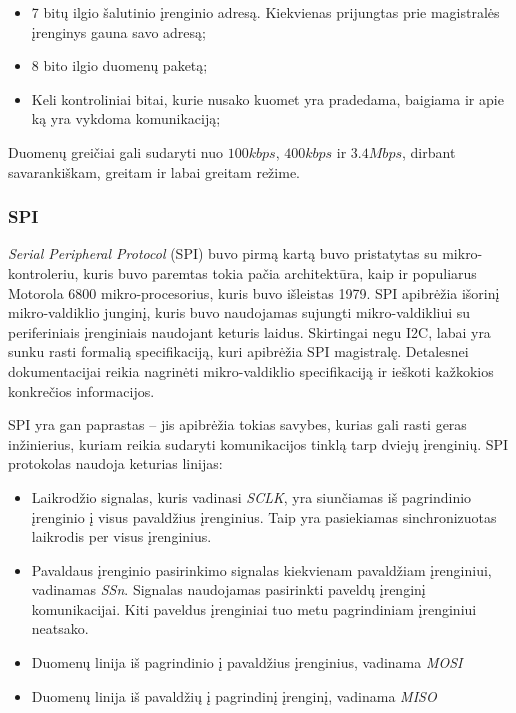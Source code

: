 \begin{itemize}
    \item 7 bitų ilgio šalutinio įrenginio adresą. Kiekvienas prijungtas prie magistralės įrenginys gauna savo adresą;
    \item 8 bito ilgio duomenų paketą;
    \item Keli kontroliniai bitai, kurie nusako kuomet yra pradedama, baigiama ir apie ką yra vykdoma komunikaciją;
\end{itemize}

Duomenų greičiai gali sudaryti nuo $100 kbps$, $400 kbps$ ir $3.4 Mbps$, dirbant savarankiškam, greitam ir labai greitam režime.

\subsubsection{SPI}

\textit{Serial Peripheral Protocol} (SPI) buvo pirmą kartą buvo pristatytas su mikro-kontroleriu, kuris buvo paremtas tokia pačia architektūra, kaip ir populiarus Motorola 6800 mikro-procesorius, kuris buvo išleistas 1979.
SPI apibrėžia išorinį mikro-valdiklio junginį, kuris buvo naudojamas sujungti mikro-valdikliui su periferiniais įrenginiais naudojant keturis laidus.
Skirtingai negu I2C, labai yra sunku rasti formalią specifikaciją, kuri apibrėžia SPI magistralę.
Detalesnei dokumentacijai reikia nagrinėti mikro-valdiklio specifikaciją ir ieškoti kažkokios konkrečios informacijos.

SPI yra gan paprastas -- jis apibrėžia tokias savybes, kurias gali rasti geras inžinierius, kuriam reikia sudaryti komunikacijos tinklą tarp dviejų įrenginių.
SPI protokolas naudoja keturias linijas:

\begin{itemize}
    \item Laikrodžio signalas, kuris vadinasi \textit{SCLK}, yra siunčiamas iš pagrindinio įrenginio į visus pavaldžius įrenginius. Taip yra pasiekiamas sinchronizuotas laikrodis per visus įrenginius.
    \item Pavaldaus įrenginio pasirinkimo signalas kiekvienam pavaldžiam įrenginiui, vadinamas \textit{SSn}. Signalas naudojamas pasirinkti paveldų įrenginį komunikacijai. Kiti paveldus įrenginiai tuo metu pagrindiniam įrenginiui neatsako.
    \item Duomenų linija iš pagrindinio į pavaldžius įrenginius, vadinama \textit{MOSI}
    \item Duomenų linija iš pavaldžių į pagrindinį įrenginį, vadinama \textit{MISO}
\end{itemize}

